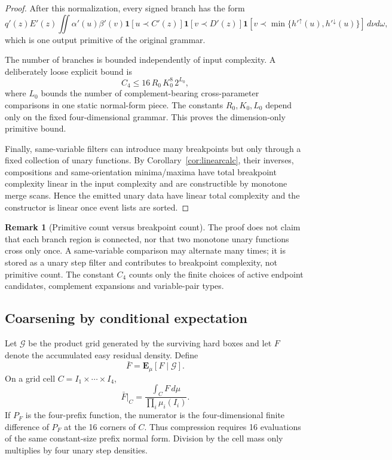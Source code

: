 \documentclass[12pt,a4paper]{article}
\theoremstyle{definition}
\newtheorem{remark}[theorem]{Remark}
\newcommand{\E}{\mathbf E}
\newcommand{\1}{\mathbf 1}
\begin{document}
\begin{proof}
After this normalization, every signed branch has the form
\[
q'(z)E'(z)
\iint \alpha'(u)\beta'(v)
\1[u\prec C'(z)]\1[v\prec D'(z)]
\1[v\prec\min\{h'^{\uparrow}(u),h'^{\downarrow}(u)\}]\,d\nu d\omega,
\]
which is one output primitive of the original grammar.

The number of branches is bounded independently of input complexity.  A deliberately loose explicit bound is
\begin{equation}
C_4\le 16\,R_0\,K_0^{8}\,2^{L_0},                            \label{eq:C4bound}
\end{equation}
where $L_0$ bounds the number of complement-bearing cross-parameter comparisons in one static normal-form piece.  The constants $R_0,K_0,L_0$ depend only on the fixed four-dimensional grammar.  This proves the dimension-only primitive bound.

Finally, same-variable filters can introduce many breakpoints but only through a fixed collection of unary functions.  By Corollary~\ref{cor:linearcalc}, their inverses, compositions and same-orientation minima/maxima have total breakpoint complexity linear in the input complexity and are constructible by monotone merge scans.  Hence the emitted unary data have linear total complexity and the constructor is linear once event lists are sorted.
\end{proof}

\begin{remark}[Primitive count versus breakpoint count]
The proof does not claim that each branch region is connected, nor that two monotone unary functions cross only once.  A same-variable comparison may alternate many times; it is stored as a unary step filter and contributes to breakpoint complexity, not primitive count.  The constant $C_4$ counts only the finite choices of active endpoint candidates, complement expansions and variable-pair types.
\end{remark}

\subsection{Coarsening by conditional expectation}

Let $\mathcal G$ be the product grid generated by the surviving hard boxes and let $F$ denote the accumulated easy residual density. Define
\[
\bar F=\E_\mu[F\mid\mathcal G].
\]
On a grid cell $C=I_1\times\cdots\times I_4$,
\[
\bar F|_C=\frac{\int_C F\,d\mu}{\prod_i\mu_i(I_i)}.
\]
If $P_F$ is the four-prefix function, the numerator is the four-dimensional finite difference of $P_F$ at the 16 corners of $C$. Thus compression requires 16 evaluations of the same constant-size prefix normal form. Division by the cell mass only multiplies by four unary step densities.
\end{document}
